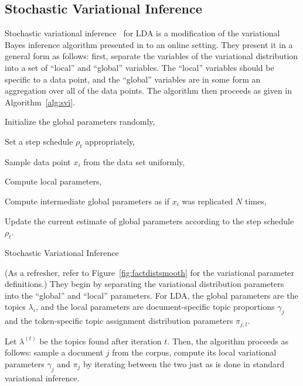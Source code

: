 \documentclass[11pt]{article}
\begin{document}
\subsection{Stochastic Variational Inference}
Stochastic variational inference~\cite{Hoffman:2013:svb} for LDA is a
modification of the variational Bayes inference algorithm presented
in \citet{Blei:2003:LDA} to an online setting. They present it in a general
form as follows: first, separate the variables of the variational
distribution into a set of ``local'' and ``global'' variables. The
``local'' variables should be specific to a data point, and the ``global''
variables are in some form an aggregation over all of the data points. The
algorithm then proceeds as given in Algorithm~\ref{alg:svi}.

\begin{algorithm}
  \begin{algorithmic}
    \State Initialize the global parameters randomly,

    \State Set a step schedule $\rho_t$ appropriately,

    \Repeat

      Sample data point $x_i$ from the data set uniformly,

      Compute local parameters,

      Compute intermediate global parameters as if $x_i$ was replicated $N$
      times,

      Update the current estimate of global parameters according to the
      step schedule $\rho_t$.
  \end{algorithmic}
  \caption{Stochastic Variational Inference}
  \label{alg:svi}
\end{algorithm}


(As a refresher, refer to Figure~\ref{fig:factdistsmooth} for the
variational parameter definitions.) They begin by separating the
variational distribution parameters into the ``global'' and ``local''
parameters. For LDA, the global parameters are the topics $\lambda_{i}$,
and the local parameters are document-specific topic proportions $\gamma_j$
and the token-specific topic assignment distribution parameters $\pi_{j,t}$.

Let $\lambda^{(t)}$ be the topics found after iteration $t$. Then, the
algorithm proceeds as follows: sample a document $j$ from the corpus,
compute its local variational parameters $\gamma_j$ and $\pi_j$ by
iterating between the two just as is done in standard variational
inference.
\end{document}
